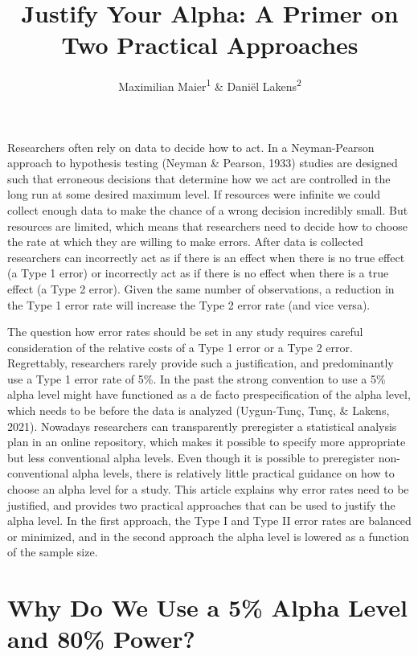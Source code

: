 \documentclass[
  english,
  ,man, a4paper,floatsintext]{apa6}
\title{Justify Your Alpha: A Primer on Two Practical Approaches}
\author{Maximilian Maier\textsuperscript{1} \& Daniël Lakens\textsuperscript{2}}
\date{}
\affiliation{\vspace{0.5cm}\textsuperscript{1} University of Amsterdam, The Netherlands\\\textsuperscript{2} Eindhoven University of Technology, The Netherlands}
\begin{document}
\maketitle

Researchers often rely on data to decide how to act. In a Neyman-Pearson approach to hypothesis testing (Neyman \& Pearson, 1933) studies are designed such that erroneous decisions that determine how we act are controlled in the long run at some desired maximum level. If resources were infinite we could collect enough data to make the chance of a wrong decision incredibly small. But resources are limited, which means that researchers need to decide how to choose the rate at which they are willing to make errors. After data is collected researchers can incorrectly act as if there is an effect when there is no true effect (a Type 1 error) or incorrectly act as if there is no effect when there is a true effect (a Type 2 error). Given the same number of observations, a reduction in the Type 1 error rate will increase the Type 2 error rate (and vice versa).

The question how error rates should be set in any study requires careful consideration of the relative costs of a Type 1 error or a Type 2 error. Regrettably, researchers rarely provide such a justification, and predominantly use a Type 1 error rate of 5\%. In the past the strong convention to use a 5\% alpha level might have functioned as a de facto prespecification of the alpha level, which needs to be before the data is analyzed (Uygun-Tunç, Tunç, \& Lakens, 2021). Nowadays researchers can transparently preregister a statistical analysis plan in an online repository, which makes it possible to specify more appropriate but less conventional alpha levels. Even though it is possible to preregister non-conventional alpha levels, there is relatively little practical guidance on how to choose an alpha level for a study. This article explains why error rates need to be justified, and provides two practical approaches that can be used to justify the alpha level. In the first approach, the Type I and Type II error rates are balanced or minimized, and in the second approach the alpha level is lowered as a function of the sample size.

\hypertarget{why-do-we-use-a-5-alpha-level-and-80-power}{%
\section{Why Do We Use a 5\% Alpha Level and 80\% Power?}\label{why-do-we-use-a-5-alpha-level-and-80-power}}
\end{document}
